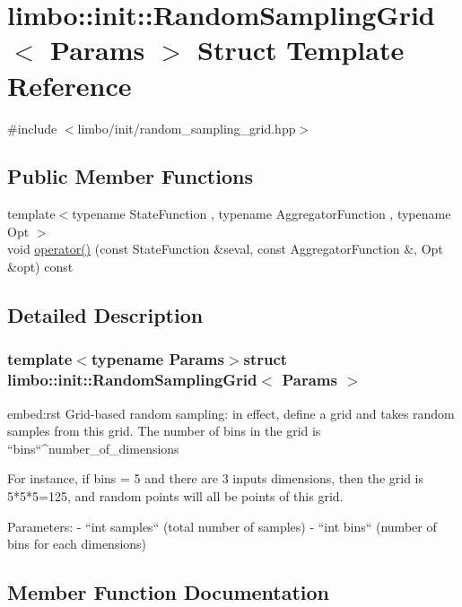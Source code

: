 \hypertarget{structlimbo_1_1init_1_1_random_sampling_grid}{}\section{limbo\+:\+:init\+:\+:Random\+Sampling\+Grid$<$ Params $>$ Struct Template Reference}
\label{structlimbo_1_1init_1_1_random_sampling_grid}


{\ttfamily \#include $<$limbo/init/random\+\_\+sampling\+\_\+grid.\+hpp$>$}

\subsection*{Public Member Functions}
\begin{DoxyCompactItemize}
\item 
{\footnotesize template$<$typename State\+Function , typename Aggregator\+Function , typename Opt $>$ }\\void \hyperlink{structlimbo_1_1init_1_1_random_sampling_grid_a6fd277031f69bf9da891b5f35065c369}{operator()} (const State\+Function \&seval, const Aggregator\+Function \&, Opt \&opt) const 
\end{DoxyCompactItemize}


\subsection{Detailed Description}
\subsubsection*{template$<$typename Params$>$struct limbo\+::init\+::\+Random\+Sampling\+Grid$<$ Params $>$}

\begin{DoxyVerb}embed:rst
Grid-based random sampling: in effect, define a grid and takes random samples from this grid. The number of bins in the grid is ``bins``^number_of_dimensions 

For instance, if bins = 5 and there are 3 inputs dimensions, then the grid is 5*5*5=125, and random points will all be points of this grid.

Parameters:
  - ``int samples`` (total number of samples)
  - ``int bins`` (number of bins for each dimensions)
\end{DoxyVerb}
 

\subsection{Member Function Documentation}
\hypertarget{structlimbo_1_1init_1_1_random_sampling_grid_a6fd277031f69bf9da891b5f35065c369}{}
